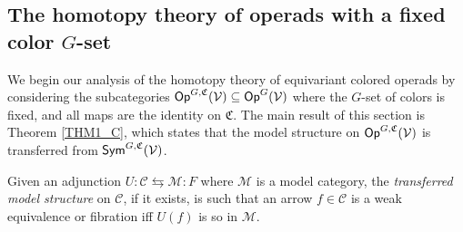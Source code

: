 \documentclass[a4paper,10pt
,draft
]{article}%
\renewcommand{\1}{\eta}%
\begin{document}


 
\subsection{The homotopy theory of operads with a fixed color $G$-set}

We begin our analysis of the homotopy theory of equivariant colored operads by
considering the subcategories $\mathsf{Op}^{G, \mathfrak C}(\mathcal V) \subseteq \mathsf{Op}^G(\mathcal V)$
where the $G$-set of colors is fixed, and all maps are the identity on $\mathfrak C$.
The main result of this section is Theorem \ref{THM1_C}, which states that
the model structure on $\mathsf{Op}^{G, \mathfrak C}(\mathcal V)$ is transferred from $\mathsf{Sym}^{G, \mathfrak C}(\mathcal V)$.

\begin{definition}
      Given an adjunction $U: \mathcal C \leftrightarrows \mathcal M :F$ where $\mathcal M$ is a model category,
      the \textit{transferred model structure} on $\mathcal C$, if it exists, is such that
      an arrow $f \in \mathcal C$ is a weak equivalence or fibration iff $U(f)$ is so in $\mathcal M$.
\end{definition}
\end{document}
